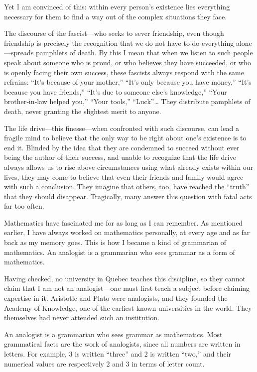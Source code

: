 \documentclass[12pt,oneside]{article}
\begin{document}
Yet I am convinced of this: within every person’s existence lies everything necessary for them to find a way out of the complex situations they face.

The discourse of the fascist—who seeks to sever friendship, even though friendship is precisely the recognition that we do not have to do everything alone—spreads pamphlets of death. By this I mean that when we listen to such people speak about someone who is proud, or who believes they have succeeded, or who is openly facing their own success, these fascists always respond with the same refrains: “It’s because of your mother,” “It’s only because you have money,” “It’s because you have friends,” “It’s due to someone else’s knowledge,” “Your brother‑in‑law helped you,” “Your tools,” “Luck”… They distribute pamphlets of death, never granting the slightest merit to anyone.

The life drive—this finesse—when confronted with such discourse, can lead a fragile mind to believe that the only way to be right about one’s existence is to end it. Blinded by the idea that they are condemned to succeed without ever being the author of their success, and unable to recognize that the life drive always allows us to rise above circumstances using what already exists within our lives, they may come to believe that even their friends and family would agree with such a conclusion. They imagine that others, too, have reached the “truth” that they should disappear. Tragically, many answer this question with fatal acts far too often.

Mathematics have fascinated me for as long as I can remember. As mentioned earlier, I have always worked on mathematics personally, at every age and as far back as my memory goes. This is how I became a kind of grammarian of mathematics. An analogist is a grammarian who sees grammar as a form of mathematics.

Having checked, no university in Quebec teaches this discipline, so they cannot claim that I am not an analogist—one must first teach a subject before claiming expertise in it. Aristotle and Plato were analogists, and they founded the Academy of Knowledge, one of the earliest known universities in the world. They themselves had never attended such an institution.

An analogist is a grammarian who sees grammar as mathematics. Most grammatical facts are the work of analogists, since all numbers are written in letters. For example, 3 is written “three” and 2 is written “two,” and their numerical values are respectively 2 and 3 in terms of letter count.
\end{document}
